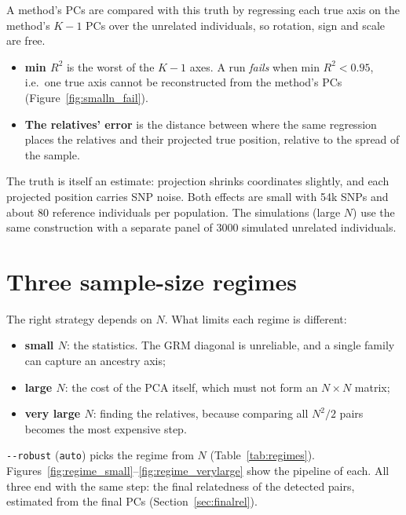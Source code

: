 \documentclass[11pt,a4paper]{article}
\newcommand{\opt}[1]{\texttt{-{}-#1}}
\begin{document}
A method's PCs are compared with this truth by regressing each true axis on
the method's $K-1$ PCs over the unrelated individuals, so rotation, sign and
scale are free.
\begin{itemize}
  \item \textbf{min $R^2$} is the worst of the $K-1$ axes. A run \emph{fails}
    when min $R^2<0.95$, i.e.\ one true axis cannot be reconstructed from the
    method's PCs (Figure~\ref{fig:smalln_fail}).
  \item \textbf{The relatives' error} is the distance between where the same
    regression places the relatives and their projected true position,
    relative to the spread of the sample.
\end{itemize}
The truth is itself an estimate: projection shrinks coordinates slightly,
and each projected position carries SNP noise. Both effects are small with
54k SNPs and about 80 reference individuals per population. The simulations
(large $N$) use the same construction with a separate panel of 3000
simulated unrelated individuals.

\section{Three sample-size regimes}
\label{sec:regimes}

The right strategy depends on $N$. What limits each regime is different:
\begin{itemize}
  \item \textbf{small $N$}: the statistics. The GRM diagonal is unreliable, and a
    single family can capture an ancestry axis;
  \item \textbf{large $N$}: the cost of the PCA itself, which must not form an
    $N\times N$ matrix;
  \item \textbf{very large $N$}: finding the relatives, because
    comparing all $N^2/2$ pairs becomes the most expensive step.
\end{itemize}
\opt{robust} (\texttt{auto}) picks the regime from $N$
(Table~\ref{tab:regimes}). Figures~\ref{fig:regime_small}--\ref{fig:regime_verylarge}
show the pipeline of each. All three end with the same step: the final
relatedness of the detected pairs, estimated from the final PCs
(Section~\ref{sec:finalrel}).
\end{document}
